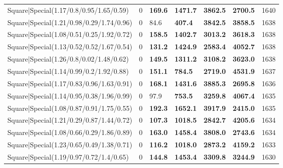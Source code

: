 \begin{tabular}{lrllllr}
 Square|Special(1.17/0.8/0.95/1.65/0.59)                       &             0   & \textbf{169.6} & \textbf{1471.7} & \textbf{3862.5} & \textbf{2700.5} &         1640 \\
 Square|Special(1.21/0.98/0.29/1.74/0.96)                      &             0   & 84.6           & \textbf{407.4}  & \textbf{3842.5} & \textbf{3858.5} &         1638 \\
 Square|Special(1.08/0.51/0.25/1.92/0.72)                      &             0   & \textbf{158.5} & \textbf{1402.7} & \textbf{3013.2} & \textbf{3618.3} &         1638 \\
 Square|Special(1.13/0.52/0.52/1.67/0.54)                      &             0   & \textbf{131.2} & \textbf{1424.9} & \textbf{2583.4} & \textbf{4052.7} &         1638 \\
 Square|Special(1.26/0.8/0.02/1.48/0.62)                       &             0   & \textbf{149.5} & \textbf{1311.2} & \textbf{3108.2} & \textbf{3623.0} &         1638 \\
 Square|Special(1.14/0.99/0.2/1.92/0.88)                       &             0   & \textbf{151.1} & \textbf{784.5}  & \textbf{2719.0} & \textbf{4531.9} &         1637 \\
 Square|Special(1.17/0.83/0.96/1.63/0.91)                      &             0   & \textbf{168.1} & \textbf{1431.6} & \textbf{3885.3} & \textbf{2695.8} &         1636 \\
 Square|Special(1.14/0.95/0.38/1.96/0.99)                      &             0   & 97.9           & \textbf{753.5}  & \textbf{3259.8} & \textbf{4067.4} &         1635 \\
 Square|Special(1.08/0.87/0.91/1.75/0.55)                      &             0   & \textbf{192.3} & \textbf{1652.1} & \textbf{3917.9} & \textbf{2415.0} &         1635 \\
 Square|Special(1.21/0.29/0.87/1.44/0.72)                      &             0   & \textbf{107.3} & \textbf{1018.5} & \textbf{2842.7} & \textbf{4205.6} &         1634 \\
 Square|Special(1.08/0.66/0.29/1.86/0.89)                      &             0   & \textbf{163.0} & \textbf{1458.4} & \textbf{3808.0} & \textbf{2743.6} &         1634 \\
 Square|Special(1.23/0.65/0.49/1.38/0.71)                      &             0   & \textbf{116.2} & \textbf{1018.0} & \textbf{2873.2} & \textbf{4159.2} &         1633 \\
 Square|Special(1.19/0.97/0.72/1.4/0.65)                       &             0   & \textbf{144.8} & \textbf{1453.4} & \textbf{3309.8} & \textbf{3244.9} &         1630 \\

\end{tabular}
